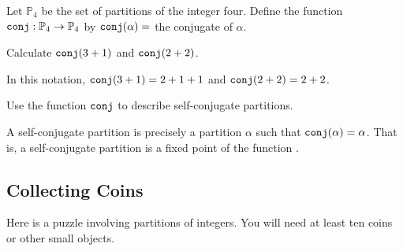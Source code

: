 \begin{exam}
\label{exam_conjugate_function}
    Let $\mathbb{P}_4$ be the set of partitions of the integer four.
    Define the function $\texttt{conj}: \mathbb{P}_4 \to \mathbb{P}_4$ by $\texttt{conj}(\alpha) = $ the conjugate of $\alpha$.
        \begin{apart}
            \item Calculate $\texttt{conj}(3+1)$ and $\texttt{conj}(2+2)$.
                \begin{soln}
                    In this notation, $\texttt{conj}(3+1)=2+1+1$ and $\texttt{conj}(2+2)=2+2$.
                \end{soln}
            \item Use the function $\texttt{conj}$ to describe self-conjugate partitions.
                \begin{soln}
                    A self-conjugate partition is precisely a partition $\alpha$ such that $\texttt{conj}(\alpha)=\alpha$. That is, a self-conjugate partition is a fixed point of the function .
                \end{soln}
        \end{apart}    
\end{exam}  


\newcommand{\subbulgsol}{Collecting Coins}
\subsection{\subbulgsol}
\label{sub_bulgarian_solitaire}

Here is a puzzle involving partitions of integers.  You will need at least ten coins or other small objects. 

